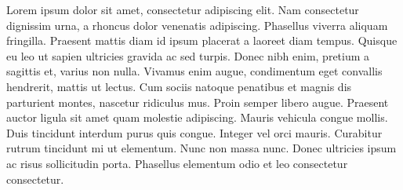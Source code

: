 \documentclass[11pt,twocolumn]{article}
\begin{document}
Lorem ipsum dolor sit amet, consectetur adipiscing elit. Nam consectetur dignissim urna, a rhoncus dolor venenatis adipiscing. Phasellus viverra aliquam fringilla. Praesent mattis diam id ipsum placerat a laoreet diam tempus. Quisque eu leo ut sapien ultricies gravida ac sed turpis. Donec nibh enim, pretium a sagittis et, varius non nulla. Vivamus enim augue, condimentum eget convallis hendrerit, mattis ut lectus. Cum sociis natoque penatibus et magnis dis parturient montes, nascetur ridiculus mus. Proin semper libero augue. Praesent auctor ligula sit amet quam molestie adipiscing. Mauris vehicula congue mollis. Duis tincidunt interdum purus quis congue. Integer vel orci mauris. Curabitur rutrum tincidunt mi ut elementum. Nunc non massa nunc. Donec ultricies ipsum ac risus sollicitudin porta. Phasellus elementum odio et leo consectetur consectetur. 
\end{document}
